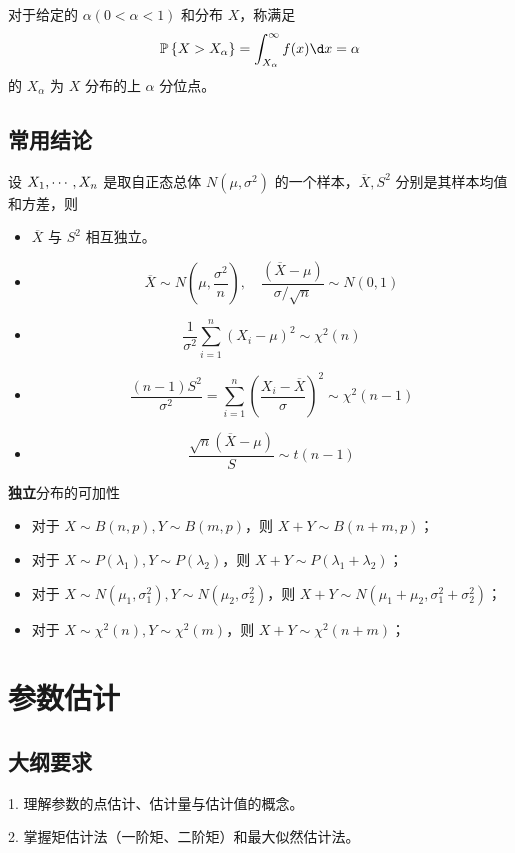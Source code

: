对于给定的 $\alpha(0 < \alpha < 1)$ 和分布 $X$，称满足
\[ \bbP\left\{X > X_\alpha\right\} = \int_{X_\alpha}^{\infty} f(x) \d x = \alpha  \]
的 $X_\alpha$ 为 $X$ 分布的上 $\alpha$ 分位点。

\subsection{常用结论}

设 $X_1,\cdots,X_n$ 是取自正态总体 $N(\mu, \sigma^2)$ 的一个样本，$\overline{X}, S^2$ 分别是其样本均值和方差，则
\begin{itemize}
	\item $\overline{X}$ 与 $S^2$ 相互独立。
	\item \[ \overline{X} \sim N\left(\mu, \frac{\sigma^2}{n}\right), \quad \frac{(\overline{X}-\mu)}{\sigma / \sqrt{n}} \sim N(0, 1) \]
	\item \[ \frac{1}{\sigma^2} \sum_{i=1}^{n} (X_i - \mu)^2 \sim \chi^2(n) \]
	\item \[ \frac{(n-1)S^2}{\sigma^2} = \sum_{i=1}^n \left(\frac{X_i - \overline{X}}{\sigma}\right)^2 \sim \chi^2(n-1) \]
	\item \[ \frac{\sqrt{n}(\overline{X}-\mu)}{S} \sim t(n-1) \]
\end{itemize}

\textbf{独立}分布的可加性
\begin{itemize}
	\item 对于 $X \sim B(n,p), Y \sim B(m, p)$，则 $X+Y \sim B(n+m,p)$；
	\item 对于 $X \sim P(\lambda_1), Y \sim P(\lambda_2)$，则 $X+Y \sim P(\lambda_1 + \lambda_2)$；
	\item 对于 $X \sim N(\mu_1, \sigma_1^2), Y \sim N(\mu_2, \sigma_2^2)$，则 $X+Y \sim N(\mu_1+\mu_2, \sigma_1^2+\sigma_2^2)$；
	\item 对于 $X \sim \chi^2(n), Y \sim \chi^2(m)$，则 $X+Y \sim \chi^2(n+m)$；
\end{itemize}

\section{参数估计}

\subsection{大纲要求}

1. 理解参数的点估计、估计量与估计值的概念。

2. 掌握矩估计法（一阶矩、二阶矩）和最大似然估计法。

